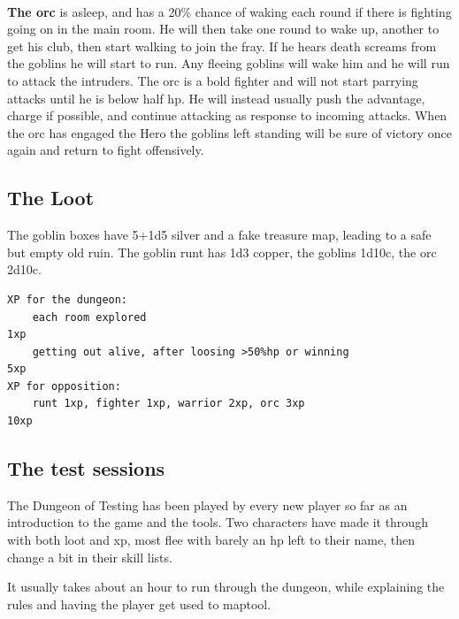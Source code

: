 \

\textbf{The orc} is asleep, and has a 20\% chance of waking each round if there is fighting going on in the main room. He will then take one round to wake up, another to get his club, then start walking to join the fray. If he hears death screams from the goblins he will start to run. Any fleeing goblins will wake him and he will run to attack the intruders. The orc is a bold fighter and will not start parrying attacks until he is below half hp. He will instead usually push the advantage, charge if possible, and continue attacking as response to incoming attacks.
When the orc has engaged the Hero the goblins left standing will be sure of victory once again and return to fight offensively.


\subsection*{The Loot}

The goblin boxes have 5+1d5 silver and a fake treasure map, leading to a safe but empty old ruin. The goblin runt has 1d3 copper, the goblins 1d10c, the orc 2d10c.\\
\begin{samepage} \small \begin{verbatim}
XP for the dungeon:
    each room explored                                                     1xp
    getting out alive, after loosing >50%hp or winning                     5xp
XP for opposition:
    runt 1xp, fighter 1xp, warrior 2xp, orc 3xp                           10xp
\end{verbatim} \end{samepage} \normalsize


\subsection*{The test sessions}

The Dungeon of Testing has been played by every new player so far as an introduction to the game and the tools. Two characters have made it through with both loot and xp, most flee with barely an hp left to their name, then change a bit in their skill lists.

It usually takes about an hour to run through the dungeon, while explaining the rules and having the player get used to maptool.









